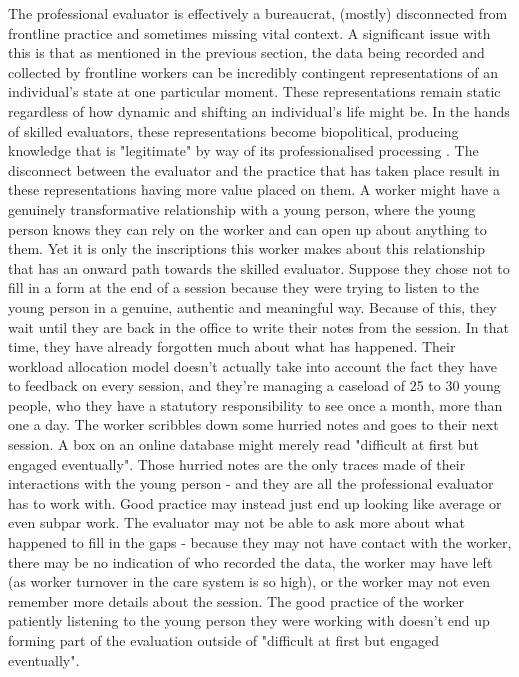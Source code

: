 The professional evaluator is effectively a bureaucrat, (mostly) disconnected from frontline practice and sometimes missing vital context. A significant issue with this is that as mentioned in the previous section, the data being recorded and collected by frontline workers can be incredibly contingent representations of an individual's state at one particular moment. These representations remain static regardless of how dynamic and shifting an individual's life might be. In the hands of skilled evaluators, these representations become biopolitical, producing knowledge that is "legitimate" by way of its professionalised processing \citep{foucault_power_2002}. The disconnect between the evaluator and the practice that has taken place result in these representations having more value placed on them. A worker might have a genuinely transformative relationship with a young person, where the young person knows they can rely on the worker and can open up about anything to them. Yet it is only the inscriptions this worker makes about this relationship that has an onward path towards the skilled evaluator. Suppose they chose not to fill in a form at the end of a session because they were trying to listen to the young person in a genuine, authentic and meaningful way. Because of this, they wait until they are back in the office to write their notes from the session. In that time, they have already forgotten much about what has happened. Their workload allocation model doesn't actually take into account the fact they have to feedback on every session, and they're managing a caseload of 25 to 30 young people, who they have a statutory responsibility to see once a month, more than one a day. The worker scribbles down some hurried notes and goes to their next session. A box on an online database might merely read "difficult at first but engaged eventually". Those hurried notes are the only traces made of their interactions with the young person - and they are all the professional evaluator has to work with. Good practice may instead just end up looking like average or even subpar work. The evaluator may not be able to ask more about what happened to fill in the gaps - because they may not have contact with the worker, there may be no indication of who recorded the data, the worker may have left (as worker turnover in the care system is so high), or the worker may not even remember more details about the session. The good practice of the worker patiently listening to the young person they were working with doesn't end up forming part of the evaluation outside of "difficult at first but engaged eventually". 

